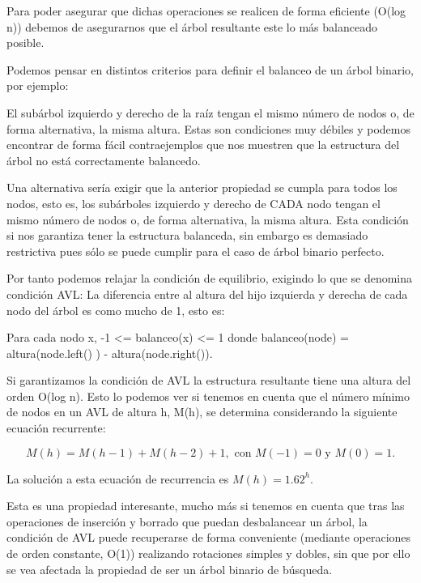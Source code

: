 Para poder asegurar que dichas operaciones se realicen de forma eficiente (O(log n)) debemos de asegurarnos que el árbol resultante este lo más balanceado posible.

Podemos pensar en distintos criterios para definir el balanceo de un árbol binario, por ejemplo\+:

\begin{DoxyItemize}
\item El subárbol izquierdo y derecho de la raíz tengan el mismo número de nodos o, de forma alternativa, la misma altura. Estas son condiciones muy débiles y podemos encontrar de forma fácil contraejemplos que nos muestren que la estructura del árbol no está correctamente balancedo.\end{DoxyItemize}
\begin{DoxyItemize}
\item Una alternativa sería exigir que la anterior propiedad se cumpla para todos los nodos, esto es, los subárboles izquierdo y derecho de C\+A\+D\+A nodo tengan el mismo número de nodos o, de forma alternativa, la misma altura. Esta condición si nos garantiza tener la estructura balanceda, sin embargo es demasiado restrictiva pues sólo se puede cumplir para el caso de árbol binario perfecto.\end{DoxyItemize}
\begin{DoxyItemize}
\item Por tanto podemos relajar la condición de equilibrio, exigindo lo que se denomina condición A\+V\+L\+: La diferencia entre al altura del hijo izquierda y derecha de cada nodo del árbol es como mucho de 1, esto es\+:\end{DoxyItemize}

\begin{DoxyCode}
Para cada nodo x,  -1 <=  balanceo(x)   <= 1
donde  balanceo(node) = altura(node.left() ) - altura(node.right()).
\end{DoxyCode}


Si garantizamos la condición de A\+V\+L la estructura resultante tiene una altura del orden O(log n). Esto lo podemos ver si tenemos en cuenta que el número mínimo de nodos en un A\+V\+L de altura h, M(h), se determina considerando la siguiente ecuación recurrente\+:

\[ M(h) = M(h-1)+M(h-2) +1, \mbox{ con } M(-1) = 0 \mbox{ y } M(0) = 1. \]

La solución a esta ecuación de recurrencia es $M(h) = 1.62^h$.

Esta es una propiedad interesante, mucho más si tenemos en cuenta que tras las operaciones de inserción y borrado que puedan desbalancear un árbol, la condición de A\+V\+L puede recuperarse de forma conveniente (mediante operaciones de orden constante, O(1)) realizando rotaciones simples y dobles, sin que por ello se vea afectada la propiedad de ser un árbol binario de búsqueda.

